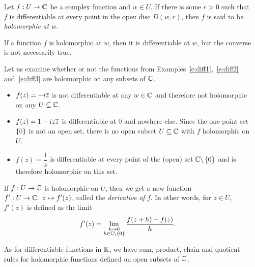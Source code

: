 \begin{definition}
Let $f:U \to \mathbb{C}$ be a complex function and $w \in U$.  If there is some $r>0$ such that $f$ is differentiable at every point in the open disc $D(w,r)$, then $f$ is said to be \emph{holomorphic at $w$}.
\end{definition}

If a function $f$ is holomorphic at $w$, then it is differentiable at $w$, but the converse is not necessarily true.


\begin{example}
Let us examine whether or not the functions from Examples~\ref{e:diff1},~\ref{e:diff2} and~\ref{e:diff3} are holomorphic on any subsets of $\mathbb{C}$.

\begin{itemize}
\item $f(z)=-i\overline{z}$ is not differentiable at any $w \in \mathbb{C}$ and therefore not holomorphic on any $U \subseteq \mathbb{C}$.
\item $f(z) = 1-i z \overline{z}$ is differentiable at $0$ and nowhere else.  Since the one-point set $\left\{0\right\}$ is not an open set, there is no open subset $U \subseteq \mathbb{C}$ with $f$ holomorphic on $U$.
\item $f(z) = \dfrac{1}{z}$ is differentiable at every point of the (open) set $\mathbb{C} \backslash \left\{0\right\}$ and is therefore holomorphic on this set.
\end{itemize}

\end{example}




If $f:U \to \mathbb{C}$ is holomorphic on $U$, then we get a new function $f':U \to \mathbb{C}, \ z \mapsto f'(z)$, called the \emph{derivative of $f$}.  In other words, for $z \in U$, $f'(z)$ is defined as the limit
\[
f'(z) = \lim_{\substack{h \to 0 \\ h \in \mathbb{C} \backslash \left\{0\right\}}} \frac{f(z+h)-f(z)}{h}.
\]



As for differentiable functions in $\mathbb{R}$, we have sum, product, chain and quotient rules for holomorphic functions defined on open subsets of $\mathbb{C}$.

